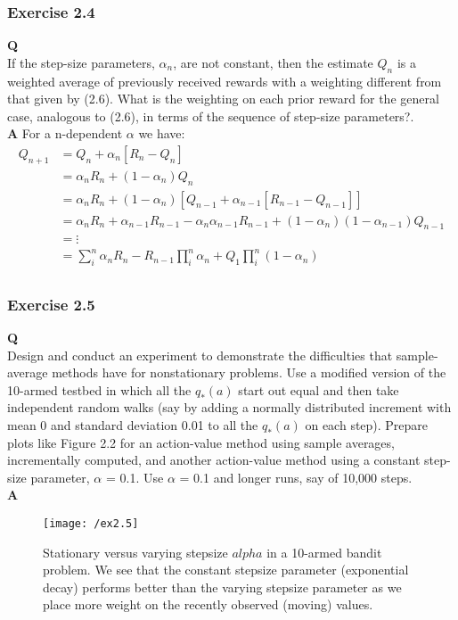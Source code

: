 \subsubsection{Exercise 2.4}
\textbf{Q}\\
If the step-size parameters, \(\alpha_n\), are not constant, then the estimate \(Q_n\) is a weighted average of previously received rewards with a weighting different from that given by (2.6). What is the weighting on each prior reward for the general case, analogous to (2.6), in terms of the sequence of step-size parameters?.\\

\textbf{A}
For a n-dependent \(\alpha\) we have:
\begin{align}
	Q_{n+1} &= Q_n +\alpha_n \left[R_n - Q_n\right] \nonumber \\
	&= \alpha_n R_n + (1-\alpha_n) Q_n\nonumber \\
	&= \alpha_n R_n + (1-\alpha_n) \left[Q_{n-1} + \alpha_{n-1} \left[R_{n-1} - Q_{n-1} \right]\right]\nonumber \\
	&= \alpha_n R_n + \alpha_{n-1} R_{n-1} - \alpha_n \alpha_{n-1} R_{n-1} + (1-\alpha_n)(1-\alpha_{n-1}) Q_{n-1} \nonumber \\
	&= \vdots \nonumber \\
	&= \sum_{i}^{n} \alpha_n R_n - R_{n-1} \prod_{i}^{n} \alpha_n + Q_{1} \prod_{i}^{n}(1-\alpha_n) \\
\end{align}

\subsubsection{Exercise 2.5}
\textbf{Q}\\
Design and conduct an experiment to demonstrate the difficulties that sample-average methods have for nonstationary problems. Use a modified version of the 10-armed testbed in which all the \(q_*(a)\) start out equal and then take independent random walks (say by adding a normally distributed increment with mean 0 and standard deviation 0.01 to all the \(q_*(a)\)  on each step). Prepare plots like Figure 2.2 for an action-value method using sample averages, incrementally computed, and another action-value method using a constant step-size parameter, \(\alpha\) = 0.1. Use \(\alpha\) = 0.1 and longer runs, say of 10,000 steps.\\

\textbf{A}\\
\ProgrammingExercise
\begin{figure}[h!]
	\centering
	\texttt{[image: /ex2.5]}
	\caption{Stationary versus varying stepsize \(alpha\) in a 10-armed bandit problem. We see that the constant stepsize parameter (exponential decay) performs better than the varying stepsize parameter as we place more weight on the recently observed (moving) values.}
	\label{fig:ex2.5}
\end{figure}

